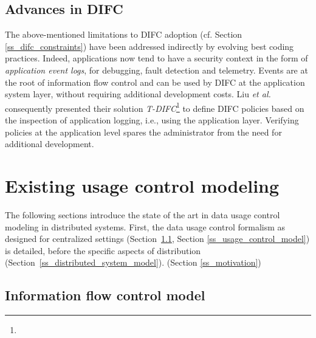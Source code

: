 \subsection{Advances in DIFC}
\label{ss_advances_difc}
The above-mentioned limitations to DIFC adoption (cf. Section \ref{ss_difc_constraints}) have been addressed indirectly by evolving best coding practices. Indeed, applications now tend to have a security context in the form of \emph{application event logs}, for debugging, fault detection and telemetry. Events are at the root of information flow control and can be used by DIFC at the application system layer, without requiring additional development costs. Liu \emph{et al.}~\cite{Liu2022} consequently presented their solution \emph{T-DIFC}\footnote{} to define DIFC policies based on the inspection of application logging, i.e., using the application layer. Verifying policies at the application level spares the administrator from the need for additional development.

\section{Existing usage control modeling }
\label{S_data_usage_control}

The following sections introduce the state of the art in data usage control modeling in distributed systems. First, the data usage control formalism as designed for centralized settings (Section~\ref{ss_ifc_model}, Section \ref{ss_usage_control_model}) is detailed, before the specific aspects of distribution (Section~\ref{ss_distributed_system_model}).  (Section \ref{ss_motivation})

\subsection{Information flow control model}
\label{ss_ifc_model}

